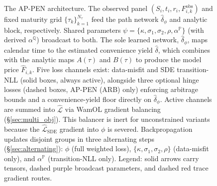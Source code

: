 \documentclass[sigconf, authorversion=true, nonacm=true]{acmart}
\begin{document}
\begin{figure}[tp]
{%
}
\caption{The AP-PEN architecture. The observed panel $(S_i, t_i, r_i, F^{\mathrm{obs}}_{i,k})$ and fixed maturity grid $\{\tau_k\}_{k=1}^{N_\tau}$ feed the path network $\hat{\delta}_\phi$ and analytic block, respectively. Shared parameters $\psi = \{\kappa, \sigma_1, \sigma_2, \rho, \alpha^{\mathbb{P}}\}$ (with derived $\alpha^{\mathbb{Q}}$) broadcast to both. The sole learned network, $\hat{\delta}_\phi$, maps calendar time to the estimated convenience yield $\hat{\delta}$, which combines with the analytic maps $A(\tau)$ and $B(\tau)$ to produce the model price $\hat{F}_{i,k}$. Five loss channels exist: data-misfit and SDE transition-NLL (solid boxes, always active), alongside three optional hinge losses (dashed boxes, AP-PEN (ARB) only) enforcing arbitrage bounds and a convenience-yield floor directly on $\hat{\delta}_\phi$. Active channels are summed into $\hat{\mathcal{L}}$ via WamOL gradient balancing (\S\ref{sec:multi_obj}). This balancer is inert for unconstrained variants because the $\hat{\mathcal{L}}_{\mathrm{SDE}}$ gradient into $\phi$ is severed. Backpropagation updates disjoint groups in three alternating steps (\S\ref{sec:alternating}): $\phi$ (full weighted loss), $\{\kappa, \sigma_1, \sigma_2, \rho\}$ (data-misfit only), and $\alpha^{\mathbb{P}}$ (transition-NLL only). Legend: solid arrows carry tensors, dashed purple broadcast parameters, and dashed red trace gradient routes.}
    \label{fig:appinn}
\end{figure}
\end{document}
